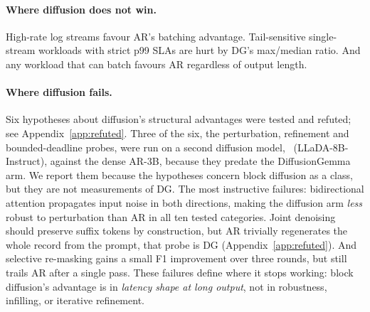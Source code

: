 \paragraph{Where diffusion does not win.}

High-rate log streams favour AR's batching advantage. Tail-sensitive
single-stream workloads with strict p99 SLAs are hurt by DG's
max/median ratio. And any workload that can batch favours AR
regardless of output length.

\paragraph{Where diffusion fails.}

Six hypotheses about diffusion's structural advantages were tested and
refuted; see Appendix~\ref{app:refuted}. Three of the six, the
perturbation, refinement and bounded-deadline probes, were run on a
second diffusion model, \LLaDA\ (LLaDA-8B-Instruct), against the dense
AR-3B, because they predate the DiffusionGemma arm. We report them
because the hypotheses concern block diffusion as a class, but they
are not measurements of DG. The most instructive failures: bidirectional
attention propagates input noise in both directions, making the
diffusion arm \emph{less} robust to perturbation than AR in all ten
tested categories. Joint denoising should preserve suffix tokens by
construction, but AR trivially regenerates the whole record from the
prompt, that probe is DG (Appendix~\ref{app:refuted}). And selective
re-masking gains a small F1 improvement over three rounds, but still
trails AR after a single pass. These failures
define where it stops working: block diffusion's advantage is in
\emph{latency shape at long output}, not in robustness, infilling, or
iterative refinement.

